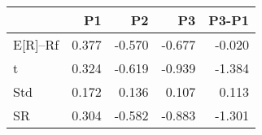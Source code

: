 \begin{tabular}{lrrrr}
\toprule
 & P1 & P2 & P3 & P3-P1 \\
\midrule
E[R]--Rf & 0.377 & -0.570 & -0.677 & -0.020 \\
t & 0.324 & -0.619 & -0.939 & -1.384 \\
Std & 0.172 & 0.136 & 0.107 & 0.113 \\
SR & 0.304 & -0.582 & -0.883 & -1.301 \\
\bottomrule
\end{tabular}
